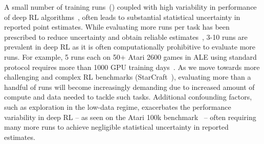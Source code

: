 A small number of training runs~() coupled with high variability in performance of deep RL algorithms~\citep{henderson2018deep, mania2018simple, clary2019let, chan2019measuring, lynnerup2020survey}, often leads to substantial statistical uncertainty in reported point estimates. 
While evaluating more runs per task has been prescribed to reduce uncertainty and obtain reliable estimates~\citep{henderson2018deep, colas2018many, jordan2020evaluating}, 3-10 runs are prevalent in deep RL as it is often computationally prohibitive to evaluate more runs. %
For example, 5 runs each on 50+ Atari 2600 games in ALE using standard protocol requires more than 1000 GPU training days~\citep{ceron2021revisiting}. As we move towards more challenging and complex RL benchmarks (\eg StarCraft~\citep{vinyals2019grandmaster}), evaluating more than a handful of runs will become increasingly demanding due to increased amount of compute and data needed to tackle such tasks. 
Additional confounding factors, such as exploration in the low-data regime, exacerbates the performance variability in deep RL -- as seen on the Atari 100k benchmark~\citep{kaiser2019model} -- often requiring many more runs to achieve negligible statistical uncertainty in reported estimates.

